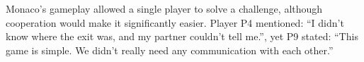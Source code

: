 Monaco's gameplay allowed a single player to solve a challenge, although cooperation would make it significantly easier. Player P4 mentioned: ``I didn't know where the exit was, and my partner couldn't tell me.'', yet P9 stated:  ``This game is simple. We didn't really need any communication with each other.''





